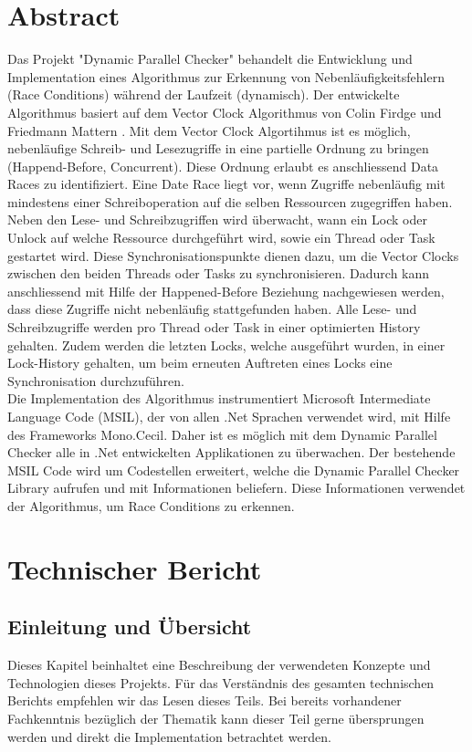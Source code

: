 \documentclass[10pt,a4paper]{article}
\begin{document}
\section{Abstract}
Das Projekt "Dynamic Parallel Checker" behandelt die Entwicklung und Implementation eines Algorithmus zur Erkennung von Nebenläufigkeitsfehlern (Race Conditions) während der Laufzeit (dynamisch). Der entwickelte Algorithmus basiert auf dem Vector Clock Algorithmus von Colin Firdge und Friedmann Mattern \cite{acsc}. Mit dem Vector Clock Algortihmus ist es möglich, nebenläufige Schreib- und Lesezugriffe in eine partielle Ordnung zu bringen (Happend-Before, Concurrent). Diese Ordnung erlaubt es anschliessend Data Races zu identifiziert. Eine Date Race liegt vor, wenn Zugriffe nebenläufig mit mindestens einer Schreiboperation auf die selben Ressourcen zugegriffen haben. Neben den Lese- und Schreibzugriffen wird überwacht, wann ein Lock oder Unlock auf welche Ressource durchgeführt wird, sowie ein Thread oder Task gestartet wird. Diese Synchronisationspunkte dienen dazu, um die Vector Clocks zwischen den beiden Threads oder Tasks zu synchronisieren. Dadurch kann anschliessend mit Hilfe der Happened-Before Beziehung nachgewiesen werden, dass diese Zugriffe nicht nebenläufig stattgefunden haben. Alle Lese- und Schreibzugriffe werden pro Thread oder Task in einer optimierten History gehalten. Zudem werden die letzten Locks, welche ausgeführt wurden, in einer Lock-History gehalten, um beim erneuten Auftreten eines Locks eine Synchronisation durchzuführen.\\
Die Implementation des Algorithmus instrumentiert Microsoft Intermediate Language Code (MSIL), der von allen .Net Sprachen verwendet wird, mit Hilfe des Frameworks Mono.Cecil. Daher ist es möglich mit dem Dynamic Parallel Checker alle in .Net entwickelten Applikationen zu überwachen. Der bestehende MSIL Code wird um Codestellen erweitert, welche die Dynamic Parallel Checker Library aufrufen und mit Informationen beliefern. Diese Informationen verwendet der Algorithmus, um Race Conditions zu erkennen.\\ 
\newpage
\section{Technischer Bericht}
\subsection{Einleitung und Übersicht}
Dieses Kapitel beinhaltet eine Beschreibung der verwendeten Konzepte und Technologien dieses Projekts. Für das Verständnis des gesamten technischen Berichts empfehlen wir das Lesen dieses Teils. Bei bereits vorhandener Fachkenntnis bezüglich der Thematik kann dieser Teil gerne übersprungen werden und direkt die Implementation betrachtet werden.
\end{document}
